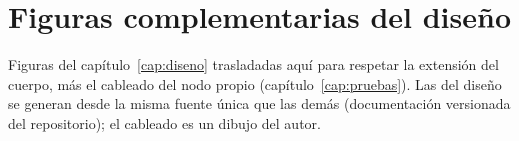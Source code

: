 \chapter[Figuras complementarias del diseño]{Figuras complementarias del diseño}
\label{anx:figuras}

Figuras del capítulo~\ref{cap:diseno} trasladadas aquí para respetar la extensión del cuerpo, más el
cableado del nodo propio (capítulo~\ref{cap:pruebas}). Las del diseño se generan desde la misma fuente única que las
demás (documentación versionada del repositorio); el cableado es un dibujo del autor.












